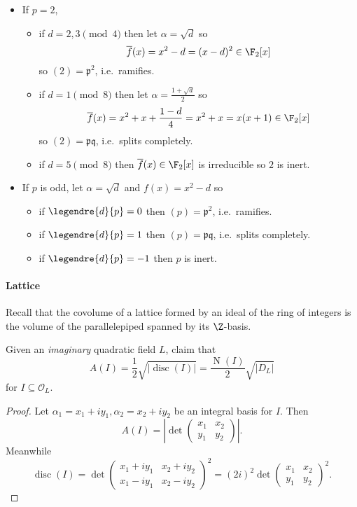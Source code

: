 \documentclass[a4paper]{article}
\renewcommand*{\O}{\mathcal{O}}
\DeclareMathOperator{\n}{N}
\DeclareMathOperator{\disc}{disc}
\newcommand*{\red}[1]{\overline{#1}}%
\begin{document}
\begin{itemize}
\item If \(p = 2\),
  \begin{itemize}
  \item if \(d = 2, 3 \pmod 4\) then let \(\alpha = \sqrt d\) so
    \[
      \red f(x) = x^2 - d = (x - d)^2 \in \F_2[x]
    \]
    so \((2) = \mathfrak{p}^2\), i.e.\ ramifies.
  \item if \(d = 1 \pmod 8\) then let \(\alpha = \frac{1 + \sqrt d}{2}\) so
    \[
      \red f(x) = x^2 + x + \frac{1 - d}{4} = x^2 + x = x(x + 1) \in \F_2[x]
    \]
    so \((2) = \mathfrak{p}\mathfrak{q}\), i.e.\ splits completely.
  \item if \(d = 5 \pmod 8\) then \(\red f(x) \in \F_2[x]\) is irreducible so \(2\) is inert.
  \end{itemize}
\item If \(p\) is odd, let \(\alpha = \sqrt d\) and \(f(x) = x^2 - d\) so
  \begin{itemize}
  \item if \(\legendre{d}{p} = 0\) then \((p) = \mathfrak{p}^2\), i.e.\ ramifies.
  \item if \(\legendre{d}{p} = 1\) then \((p) = \mathfrak{p}\mathfrak{q}\), i.e.\ splits completely.
  \item if \(\legendre{d}{p} = -1\) then \(p\) is inert.
  \end{itemize}
\end{itemize}

\paragraph{Lattice}

Recall that the covolume of a lattice formed by an ideal of the ring of integers is the volume of the parallelepiped spanned by its \(\Z\)-basis.

Given an \emph{imaginary} quadratic field \(L\), claim that
\[
  A(I) = \frac{1}{2}\sqrt{|\disc(I)|} = \frac{\n(I)}{2}\sqrt{|D_L|}
\]
for \(I \subseteq \O_L\).

\begin{proof}
  Let \(\alpha_1 = x_1 + iy_1, \alpha_2 = x_2 + iy_2\) be an integral basis for \(I\). Then
  \[
    A(I) = \left| \det
      \begin{pmatrix}
        x_1 & x_2 \\
        y_1 & y_2
      \end{pmatrix}
    \right|.
  \]
  Meanwhile
  \[
    \disc(I)
    = \det
    \begin{pmatrix}
      x_1 + iy_1 & x_2 + iy_2 \\
      x_1 - iy_1 & x_2 - iy_2
    \end{pmatrix}
    ^2
    = (2i)^2 \det
    \begin{pmatrix}
      x_1 & x_2 \\
      y_1 & y_2
    \end{pmatrix}
    ^2
    .
  \]
\end{proof}
\end{document}
